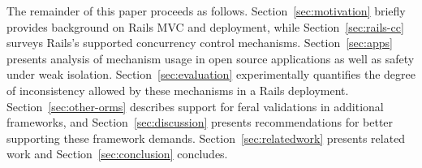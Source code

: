 The remainder of this paper proceeds as
follows. Section~\ref{sec:motivation} briefly provides background on
Rails MVC and deployment, while Section~\ref{sec:rails-cc} surveys
Rails's supported concurrency control
mechanisms. Section~\ref{sec:apps} presents analysis of mechanism
usage in open source applications as well as safety under weak
isolation.  Section~\ref{sec:evaluation} experimentally quantifies the
degree of inconsistency allowed by these mechanisms in a Rails
deployment. Section~\ref{sec:other-orms} describes support for feral
validations in additional frameworks, and
Section~\ref{sec:discussion} presents recommendations for better
supporting these framework demands. Section~\ref{sec:relatedwork}
presents related work and Section~\ref{sec:conclusion} concludes.
